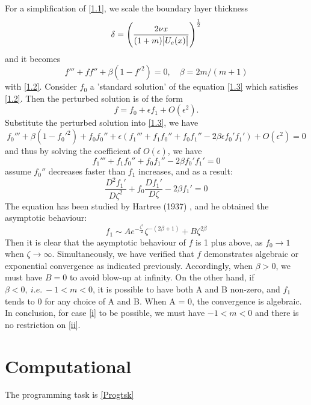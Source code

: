\documentclass[a4paper,11pt]{article}
\begin{document}
\begin{enumerate}
      For a simplification of \ref{1.1}, we scale  the boundary layer thickness $$\delta = \left(\frac{2\nu x}{(1+m)\abs{U_{e}(x)}}\right)^{\frac{1}{2}}$$ and it becomes \begin{equation} \label{1.3}      
             f''' + ff''+\beta(1-f'^2) = 0,\quad \beta = 2m/(m+1) \tag{1.3}
      \end{equation} with \ref{1.2}.
      Consider $f_{0}$ a 'standard solution' of the equation \ref{1.3} which satisfies \ref{1.2}. Then the perturbed solution is of the form 
      $$f = f_{0}+ \epsilon f_{1} + O(\epsilon^2).$$ Substitute the perturbed solution into \ref{1.3}, we have 
      \begin{equation*}
      f_{0}'''+ \beta(1-f_{0}'^2)+f_{0}f_{0}''+\epsilon (f_{1}''' +f_{1}f_{0}'' +
f_{0}f_{1}''-2\beta\epsilon f_{0}'f_{1}')  +O(\epsilon^{2}) = 0 
      \end{equation*} and thus by solving the coefficient of $O(\epsilon)$,  we have
      \begin{equation*}
      f_{1}''' + f_{1}f_{0}'' + f_{0}f_{1}'' -2\beta f_{0}'f_{1}' = 0 
      \end{equation*}
       assume $f_{0}'' $ decreases faster than $f_{1}$ increases, and as a result:
      \begin{equation} \label{1.4}
      \frac{D^{2}f_{1}'}{D\zeta^{2}} +f_{0} \frac{Df_{1}'}{D\zeta}-2\beta f_{1}' = 0 \tag{1.4}
      \end{equation}
    The equation has been studied by Hartree (1937) \cite{hartree_1937}, and he obtained the asymptotic behaviour:
    \begin{equation*}
    f_1 \sim Ae^{-\frac{\zeta^{2}}{2}}\zeta^{-(2\beta +1)} +B\zeta^{2\beta}
    \end{equation*}
     Then it is clear that the asymptotic behaviour of $f$ is 1 plus above, as $f_{0} \to 1$ when  $\zeta \to \infty.$ Simultaneously, we have verified that $f$ demonstrates algebraic or exponential convergence as indicated previously.
     Accordingly, when $\beta > 0$, we must have $B = 0$ to avoid blow-up at infinity. On the other hand, if $\beta < 0,\ i.e.\ -1<m<0$, it is possible to have both A and B non-zero, and $f_{1}$ tends to 0 for any choice of A and B. When A = 0, the convergence is algebraic.
     In conclusion, for case \ref{i} to be possible, we must have $-1<m<0$ and there is no restriction on \ref{ii}.
     \end{enumerate}

\section{Computational}
The programming task is \ref{Progtsk}
\end{document}
